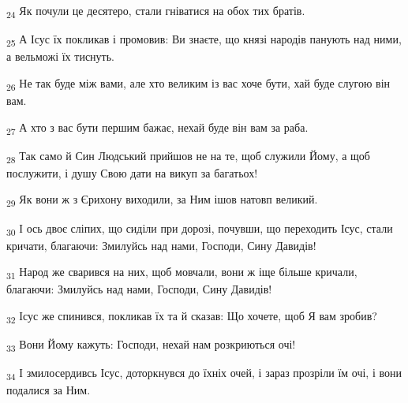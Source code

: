 \begin{tcolorbox}
\textsubscript{24} Як почули це десятеро, стали гніватися на обох тих братів.
\end{tcolorbox}
\begin{tcolorbox}
\textsubscript{25} А Ісус їх покликав і промовив: Ви знаєте, що князі народів панують над ними, а вельможі їх тиснуть.
\end{tcolorbox}
\begin{tcolorbox}
\textsubscript{26} Не так буде між вами, але хто великим із вас хоче бути, хай буде слугою він вам.
\end{tcolorbox}
\begin{tcolorbox}
\textsubscript{27} А хто з вас бути першим бажає, нехай буде він вам за раба.
\end{tcolorbox}
\begin{tcolorbox}
\textsubscript{28} Так само й Син Людський прийшов не на те, щоб служили Йому, а щоб послужити, і душу Свою дати на викуп за багатьох!
\end{tcolorbox}
\begin{tcolorbox}
\textsubscript{29} Як вони ж з Єрихону виходили, за Ним ішов натовп великий.
\end{tcolorbox}
\begin{tcolorbox}
\textsubscript{30} І ось двоє сліпих, що сиділи при дорозі, почувши, що переходить Ісус, стали кричати, благаючи: Змилуйсь над нами, Господи, Сину Давидів!
\end{tcolorbox}
\begin{tcolorbox}
\textsubscript{31} Народ же сварився на них, щоб мовчали, вони ж іще більше кричали, благаючи: Змилуйсь над нами, Господи, Сину Давидів!
\end{tcolorbox}
\begin{tcolorbox}
\textsubscript{32} Ісус же спинився, покликав їх та й сказав: Що хочете, щоб Я вам зробив?
\end{tcolorbox}
\begin{tcolorbox}
\textsubscript{33} Вони Йому кажуть: Господи, нехай нам розкриються очі!
\end{tcolorbox}
\begin{tcolorbox}
\textsubscript{34} І змилосердивсь Ісус, доторкнувся до їхніх очей, і зараз прозріли їм очі, і вони подалися за Ним.
\end{tcolorbox}
